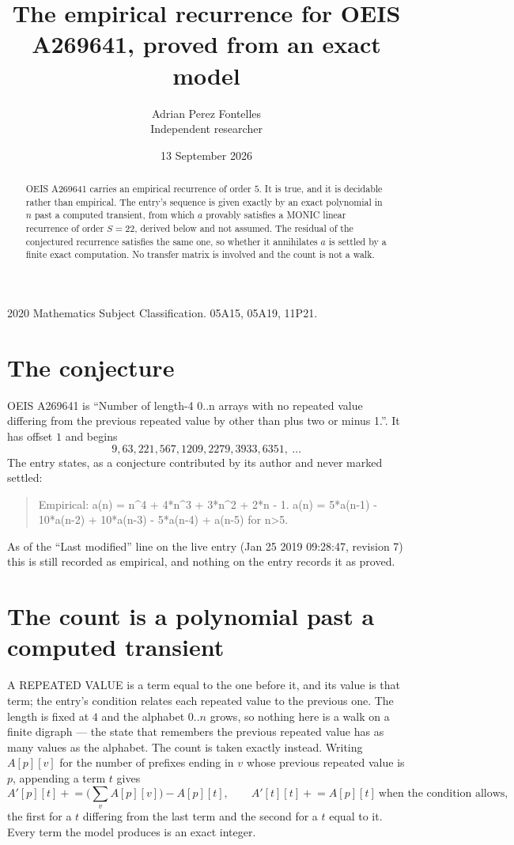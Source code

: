 \documentclass[11pt,a4paper]{article}
\title{The empirical recurrence for OEIS A269641, proved from an exact model}
\author{Adrian Perez Fontelles\\ \small Independent researcher}
\date{13 September 2026}
\theoremstyle{plain}
\theoremstyle{definition}
\begin{document}
\maketitle

\begin{abstract}
OEIS A269641 carries an empirical recurrence of order $5$. It is true, and it is
decidable rather than empirical. The entry's sequence is given exactly by an exact polynomial in $n$ past a computed transient, from
which $a$ provably satisfies a MONIC linear recurrence of order $S=22$, derived below and not
assumed. The residual of the conjectured recurrence satisfies the same one, so whether it
annihilates $a$ is settled by a finite exact computation. No transfer matrix is involved and
the count is not a walk.
\end{abstract}

\noindent\small 2020 Mathematics Subject Classification. 05A15, 05A19, 11P21.\normalsize

\section{The conjecture}

OEIS A269641 is ``Number of length-4 0..n arrays with no repeated value differing from the previous repeated value by other than plus two or minus 1.''. It has offset $1$ and begins
\[
9, 63, 221, 567, 1209, 2279, 3933, 6351,\ \dots
\]
The entry states, as a conjecture contributed by its author and never marked settled:
\begin{quote}
Empirical: a(n) = n\^{}4 + 4*n\^{}3 + 3*n\^{}2 + 2*n - 1. a(n) = 5*a(n-1) - 10*a(n-2) + 10*a(n-3) - 5*a(n-4) + a(n-5) for n>5.
\end{quote}
As of the ``Last modified'' line on the live entry (Jan 25 2019 09:28:47, revision 7)
this is still recorded as empirical, and nothing on the entry records it as proved.

\section{The count is a polynomial past a computed transient}

A REPEATED VALUE is a term equal to the one before it, and its value is that term; the entry's
condition relates each repeated value to the previous one. The length is fixed at $4$ and the
alphabet $0..n$ grows, so nothing here is a walk on a finite digraph --- the state that
remembers the previous repeated value has as many values as the alphabet. The count is taken
exactly instead. Writing $A[p][v]$ for the number of prefixes ending in $v$ whose previous
repeated value is $p$, appending a term $t$ gives
\[
A'[p][t] \mathrel{+}= \Big(\sum_v A[p][v]\Big) - A[p][t],
\qquad
A'[t][t] \mathrel{+}= A[p][t]\ \text{when the condition allows},
\]
the first for a $t$ differing from the last term and the second for a $t$ equal to it. Every
term the model produces is an exact integer.
\end{document}

